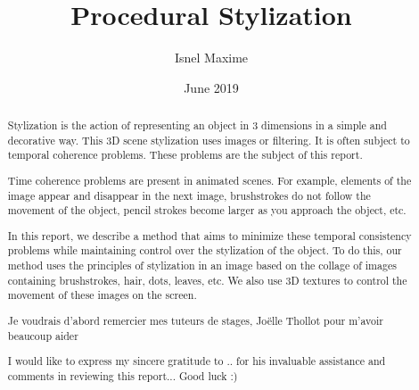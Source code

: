 \documentclass[12pt, a4paper]{memoir} %
\title{Procedural Stylization} %
\author{Isnel Maxime}
\date{June 2019} %
\begin{document}
\frontmatter
\begin{titlingpage}
\maketitle
\end{titlingpage}

\setlength{\parskip}{-1pt plus 1pt}

\renewcommand{\abstracttextfont}{\normalfont}
\abstractintoc
\begin{abstract}

    
Stylization is the action of representing an object in 3 dimensions in a simple and decorative way. This 3D scene stylization uses images or filtering. It is often subject to temporal coherence problems. These problems are the subject of this report.

Time coherence problems are present in animated scenes. For example, elements of the image appear and disappear in the next image, brushstrokes do not follow the movement of the object, pencil strokes become larger as you approach the object, etc.

In this report, we describe a method that aims to minimize these temporal consistency problems while maintaining control over the stylization of the object. To do this, our method uses the principles of stylization in an image based on the collage of images containing brushstrokes, hair, dots, leaves, etc. We also use 3D textures to control the movement of these images on the screen.

\end{abstract}
\abstractintoc

\renewcommand\abstractname{Acknowledgement}
\begin{abstract}

    Je voudrais d'abord remercier mes tuteurs de stages, Joëlle Thollot pour m'avoir beaucoup aider


I would like to express my sincere gratitude to .. for his invaluable assistance and comments in reviewing this report...
Good luck :)
\end{abstract}
\end{document}
